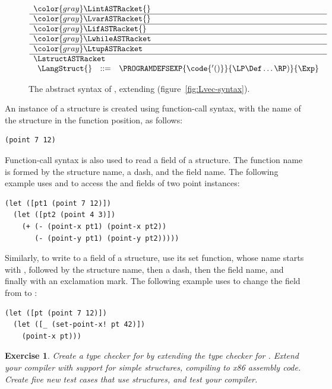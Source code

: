 \documentclass[7x10]{TimesAPriori_MIT}%
\newcommand{\gray}[1]{{\color{gray} #1}}
\newtheorem{exercise}[theorem]{Exercise}
\numberwithin{theorem}{chapter}
\numberwithin{definition}{chapter}
\numberwithin{equation}{chapter}
\begin{document}
{\begin{figure}[tbp]
\centering
\begin{tcolorbox}[colback=white]
    \small
\[
\begin{array}{l}
  \gray{\LintASTRacket{}} \\ \hline
  \gray{\LvarASTRacket{}} \\ \hline
  \gray{\LifASTRacket{}} \\ \hline
  \gray{\LwhileASTRacket} \\ \hline
  \gray{\LtupASTRacket} \\  \hline
  \LstructASTRacket \\
\begin{array}{lcl}
  \LangStruct{} &::=& \PROGRAMDEFSEXP{\code{'()}}{\LP\Def\ldots\RP)}{\Exp}
\end{array}
\end{array}
\]
\end{tcolorbox}

\caption{The abstract syntax of \LangStruct{}, extending \LangVec{}
  (figure~\ref{fig:Lvec-syntax}).}
\label{fig:Lstruct-syntax}
\end{figure}

An instance of a structure is created using function-call syntax, with
the name of the structure in the function position, as follows:
\begin{lstlisting}
(point 7 12)
\end{lstlisting}
Function-call syntax is also used to read a field of a structure. The
function name is formed by the structure name, a dash, and the field
name. The following example uses  and  to
access the  and  fields of two point instances:
\begin{center}
\begin{lstlisting}
(let ([pt1 (point 7 12)])
  (let ([pt2 (point 4 3)])
    (+ (- (point-x pt1) (point-x pt2))
       (- (point-y pt1) (point-y pt2)))))
\end{lstlisting}
\end{center}
Similarly, to write to a field of a structure, use its set function,
whose name starts with , followed by the structure name,
then a dash, then the field name, and finally with an exclamation
mark. The following example uses  to change the
 field from  to :
\begin{center}
  \begin{lstlisting}
(let ([pt (point 7 12)])
  (let ([_ (set-point-x! pt 42)])
    (point-x pt)))
\end{lstlisting}
\end{center}

\begin{exercise}\normalfont\normalsize
  Create a type checker for \LangStruct{} by extending the type
  checker for \LangVec{}. Extend your compiler with support for simple
  structures, compiling \LangStruct{} to x86 assembly code. Create
  five new test cases that use structures, and test your compiler.
\end{exercise}


\clearpage
\fi}
\end{document}
